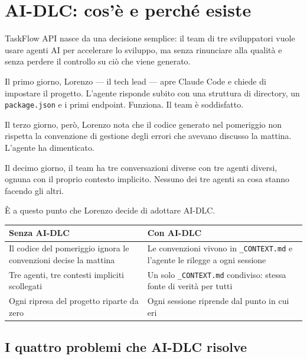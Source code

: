 ﻿%

\chapter{AI-DLC: cos'è e perché esiste}
\label{ch:cose-ai-dlc}

TaskFlow API nasce da una decisione semplice: il team di tre sviluppatori vuole usare agenti AI per accelerare lo sviluppo, ma senza rinunciare alla qualità e senza perdere il controllo su ciò che viene generato.

Il primo giorno, Lorenzo --- il tech lead --- apre Claude Code e chiede di impostare il progetto. L'agente risponde subito con una struttura di directory, un \texttt{package.json} e i primi endpoint. Funziona. Il team è soddisfatto.

Il terzo giorno, però, Lorenzo nota che il codice generato nel pomeriggio non rispetta la convenzione di gestione degli errori che avevano discusso la mattina. L'agente ha dimenticato.

Il decimo giorno, il team ha tre conversazioni diverse con tre agenti diversi, ognuna con il proprio contesto implicito. Nessuno dei tre agenti sa cosa stanno facendo gli altri.

È a questo punto che Lorenzo decide di adottare AI-DLC.

\begin{beforeafterbox}
\begin{tabularx}{\linewidth}{@{}>{\raggedright\arraybackslash}X >{\raggedright\arraybackslash}X@{}}
\textbf{Senza AI-DLC} & \textbf{Con AI-DLC} \\
\midrule
Il codice del pomeriggio ignora le convenzioni decise la mattina & Le convenzioni vivono in \texttt{\_CONTEXT.md} e l'agente le rilegge a ogni sessione \\[3pt]
Tre agenti, tre contesti impliciti scollegati & Un solo \texttt{\_CONTEXT.md} condiviso: stessa fonte di verità per tutti \\[3pt]
Ogni ripresa del progetto riparte da zero & Ogni sessione riprende dal punto in cui eri \\
\end{tabularx}
\end{beforeafterbox}

\section{I quattro problemi che AI-DLC risolve}
\label{sec:01-quattro-problemi}

